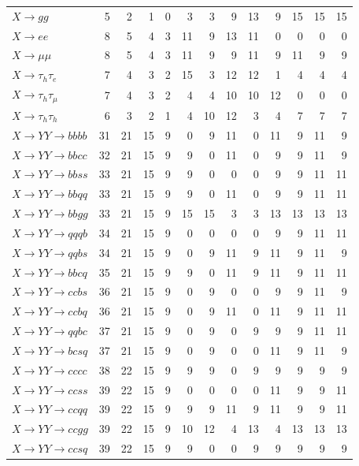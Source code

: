 {\begin{longtable}{l rrrrrrrrrrrr}
$X\to gg$ & 5 & 2 & 1 & 0 & 3 & 3 & 9 & 13 & 9 & 15 & 15 & 15 \\
\addlinespace[2pt]
$X\to ee$ & 8 & 5 & 4 & 3 & 11 & 9 & 13 & 11 & 0 & 0 & 0 & 0 \\
$X\to \mu\mu$ & 8 & 5 & 4 & 3 & 11 & 9 & 9 & 11 & 9 & 11 & 9 & 9 \\
\addlinespace[2pt]
$X\to \tau_h\tau_e$ & 7 & 4 & 3 & 2 & 15 & 3 & 12 & 12 & 1 & 4 & 4 & 4 \\
$X\to \tau_h\tau_\mu$ & 7 & 4 & 3 & 2 & 4 & 4 & 10 & 10 & 12 & 0 & 0 & 0 \\
\addlinespace[2pt]
$X\to \tau_h\tau_h$ & 6 & 3 & 2 & 1 & 4 & 10 & 12 & 3 & 4 & 7 & 7 & 7 \\
\addlinespace[2pt]
$X\to YY\to bbbb$ & 31 & 21 & 15 & 9 & 0 & 9 & 11 & 0 & 11 & 9 & 11 & 9 \\
$X\to YY\to bbcc$ & 32 & 21 & 15 & 9 & 9 & 0 & 11 & 0 & 9 & 9 & 11 & 9 \\
$X\to YY\to bbss$ & 33 & 21 & 15 & 9 & 9 & 0 & 0 & 0 & 9 & 9 & 11 & 11 \\
$X\to YY\to bbqq$ & 33 & 21 & 15 & 9 & 9 & 0 & 11 & 0 & 9 & 9 & 11 & 11 \\
$X\to YY\to bbgg$ & 33 & 21 & 15 & 9 & 15 & 15 & 3 & 3 & 13 & 13 & 13 & 13 \\
$X\to YY\to qqqb$ & 34 & 21 & 15 & 9 & 0 & 0 & 0 & 0 & 9 & 9 & 11 & 11 \\
$X\to YY\to qqbs$ & 34 & 21 & 15 & 9 & 0 & 9 & 11 & 9 & 11 & 9 & 11 & 9 \\
$X\to YY\to bbcq$ & 35 & 21 & 15 & 9 & 9 & 0 & 11 & 9 & 11 & 9 & 11 & 11 \\
$X\to YY\to ccbs$ & 36 & 21 & 15 & 9 & 0 & 9 & 0 & 0 & 9 & 9 & 11 & 9 \\
$X\to YY\to ccbq$ & 36 & 21 & 15 & 9 & 0 & 9 & 11 & 0 & 11 & 9 & 11 & 11 \\
$X\to YY\to qqbc$ & 37 & 21 & 15 & 9 & 0 & 9 & 0 & 9 & 9 & 9 & 11 & 11 \\
$X\to YY\to bcsq$ & 37 & 21 & 15 & 9 & 0 & 9 & 0 & 0 & 11 & 9 & 11 & 9 \\
$X\to YY\to cccc$ & 38 & 22 & 15 & 9 & 9 & 9 & 0 & 9 & 9 & 9 & 9 & 9 \\
$X\to YY\to ccss$ & 39 & 22 & 15 & 9 & 0 & 0 & 0 & 0 & 11 & 9 & 9 & 11 \\
$X\to YY\to ccqq$ & 39 & 22 & 15 & 9 & 9 & 9 & 11 & 9 & 11 & 9 & 9 & 11 \\
$X\to YY\to ccgg$ & 39 & 22 & 15 & 9 & 10 & 12 & 4 & 13 & 4 & 13 & 13 & 13 \\
$X\to YY\to ccsq$ & 39 & 22 & 15 & 9 & 9 & 0 & 0 & 9 & 9 & 9 & 9 & 9 \\

\end{longtable}}
